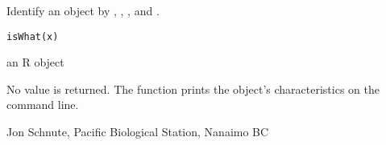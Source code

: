 \documentclass[letterpaper]{book}
\begin{document}
\begin{Description}\relax
Identify an object by , , ,
and .
\end{Description}
\begin{Usage}
\begin{verbatim}
isWhat(x)
\end{verbatim}
\end{Usage}
\begin{Arguments}
\begin{ldescription}
\item[\code{x}] an R object
\end{ldescription}
\end{Arguments}
\begin{Value}
No value is returned. The function prints the object's 
characteristics on the command line.
\end{Value}
\begin{Author}\relax
Jon Schnute, Pacific Biological Station, Nanaimo BC
\end{Author}
\end{document}
